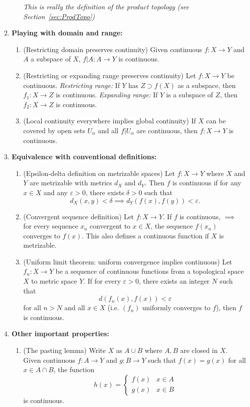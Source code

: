 \documentclass[letterpaper, 12pt]{book}
\newcommand{\eps}{\varepsilon}
\begin{document}
\begin{enumerate}[resume]
\begin{enumerate}
            \textit{This is really the definition of the product topology (see Section~\ref{sec:ProdTopo})}
        \end{enumerate}
    \item \textbf{Playing with domain and range:}
        \begin{enumerate}[resume]
        \item (Restricting domain preserves continuity) Given continuous $f:X\to Y$ and $A$ a subspace of $X$, $f|A : A\to Y$ is continuous.
        \item (Restricting or expanding range preserves continuity) Let $f:X\to Y$ be continuous. \textit{Restricting range:} If $Y$ has $Z \supset f(X)$ as a subspace, then $f_1: X\to Z$ is continuous. \textit{Expanding range:} If $Y$ is a subspace of $Z$, then $f_2:X\to Z$ is continuous.
        \item (Local continuity everywhere implies global continuity) If $X$ can be covered by open sets $U_\alpha$ and all $f|U_\alpha$ are continuous, then $f:X\to Y$ is continuous.
        \end{enumerate}
    \item \textbf{Equivalence with conventional definitions:}
        \begin{enumerate}[resume]
        \item (Epsilon-delta definition on metrizable spaces) Let $f:X\to Y$ where $X$ and $Y$ are metrizable with metrics $d_X$ and $d_Y$. Then $f$ is continuous if for any $x\in X$ and any $\eps > 0$, there exists $\delta > 0$ such that \[d_X(x, y) < \delta \implies d_Y(f(x), f(y)) < \eps.\]
        \item (Convergent sequence definition) Let $f:X\to Y$. If $f$ is continuous, $\implies$ for every sequence $x_n$ convergent to $x\in X$, the sequence $f(x_n)$ converges to $f(x)$. This also defines a continuous function if $X$ is metrizable.
        \item (Uniform limit theorem: uniform convergence implies continuous) Let $f_n : X\to Y$ be a sequence of continuous functions from a topological space $X$ to metric space $Y$. If for every $\eps> 0$, there exists an integer $N$ such that \[d(f_n(x), f(x)) < \eps\] for all $n>N$ and all $x\in X$ (i.e. $(f_n)$ uniformly converges to $f$), then $f$ is continuous.
        \end{enumerate}
    \item \textbf{Other important properties:}
        \begin{enumerate}[resume]
        \item (The pasting lemma) Write $X$ as $A\cup B$ where $A, B$ are closed in $X$. Given continuous $f:A\to Y$ and $g:B\to Y$ such that $f(x) = g(x)$ for all $x\in A \cap B$, the function \[h(x) = \begin{cases}f(x) & x\in A \\ g(x) & x\in B\end{cases}\] is continuous.

\end{enumerate}
\end{enumerate}
\end{document}

